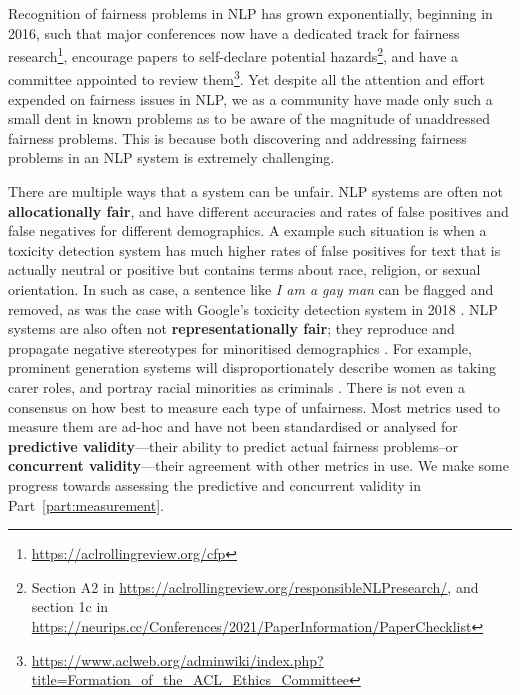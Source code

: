 Recognition of fairness problems in NLP has grown exponentially, beginning in 2016, such that major conferences now have a dedicated track for fairness research\footnote{\url{https://aclrollingreview.org/cfp}}, encourage papers to self-declare potential hazards\footnote{Section A2 in \url{https://aclrollingreview.org/responsibleNLPresearch/}, and section 1c in \url{https://neurips.cc/Conferences/2021/PaperInformation/PaperChecklist}}, and have a committee appointed to review them\footnote{\url{https://www.aclweb.org/adminwiki/index.php?title=Formation_of_the_ACL_Ethics_Committee}}. Yet despite all the attention and effort expended on fairness issues in NLP, we as a community have made only such a small dent in known problems as to be aware of the magnitude of unaddressed fairness problems. This is because both discovering and addressing fairness problems in an NLP system is extremely challenging. 

There are multiple ways that a system can be unfair. NLP systems are often not \textbf{allocationally fair}, and have different accuracies and rates of false positives and false negatives for different demographics. A example such situation is when a toxicity detection system has much higher rates of false positives for text that is actually neutral or positive but contains terms about race, religion, or sexual orientation. In such as case, a sentence like \textit{ I am a gay man} can be flagged and removed, as was the case with Google's toxicity detection system in 2018 \citep{Dixon2018MeasuringAM}. NLP systems are also often not \textbf{representationally fair}; they reproduce and propagate negative stereotypes for minoritised demographics \citep{crawford_keynote}. For example, prominent generation systems will disproportionately describe women as taking carer roles, and portray racial minorities as criminals \citep{sheng-etal-2019-woman}. There is not even a consensus on how best to measure each type of unfairness. Most metrics used to measure them are ad-hoc and have not been standardised or analysed for \textbf{predictive validity}---their ability to predict actual fairness problems--or \textbf{concurrent validity}---their agreement with other metrics in use. We make some progress towards assessing the predictive and concurrent validity in Part~\ref{part:measurement}.  

